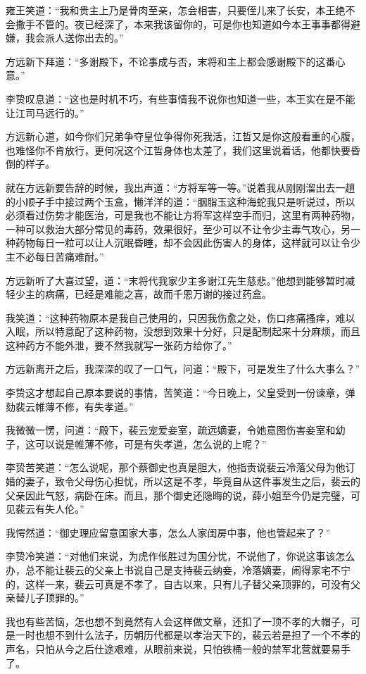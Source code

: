 雍王笑道：“我和贵主上乃是骨肉至亲，怎会相害，只要侄儿来了长安，本王绝不会撒手不管的。夜已经深了，本来我该留你的，可是你也知道如今本王事事都得避嫌，我会派人送你出去的。”

方远新下拜道：“多谢殿下，不论事成与否，末将和主上都会感谢殿下的这番心意。”

李贽叹息道：“这也是时机不巧，有些事情我不说你也知道一些，本王实在是不能让江司马远行的。”

方远新心道，如今你们兄弟争夺皇位争得你死我活，江哲又是你这般看重的心腹，也难怪你不肯放行，更何况这个江哲身体也太差了，我们这里说着话，他都快要昏倒的样子。

就在方远新要告辞的时候，我出声道：“方将军等一等。”说着我从刚刚溜出去一趟的小顺子手中接过两个玉盒，懒洋洋的道：“胭脂玉这种海蛇我只是听说过，所以必须看过伤势才能医治，可是我也不能让方将军这样空手而归，这里有两种药物，一种可以救治大部分常见的毒药，效果很好，至少可以不让令少主毒气攻心，另一种药物每日一粒可以让人沉眠昏睡，却不会因此伤害人的身体，这样就可以让令少主不必每日苦痛难耐。”

方远新听了大喜过望，道：“末将代我家少主多谢江先生慈悲。”他想到能够暂时减轻少主的病痛，已经是难能之喜，故而千恩万谢的接过药盒。

我笑道：“这种药物原本是我自己使用的，只因我伤愈之处，伤口疼痛搔痒，难以入眠，所以特意配了这种药物，没想到效果十分好，只是配制起来十分麻烦，而且这种药方不能外泄，要不然我就写一张药方给你了。”

方远新离开之后，我深深的叹了一口气，问道：“殿下，可是发生了什么大事么？”

李贽这才想起自己原本要说的事情，苦笑道：“今日晚上，父皇受到一份谏章，弹劾裴云帷薄不修，有失孝道。”

我微微一愣，问道：“殿下，裴云宠爱妾室，疏远嫡妻，令她意图伤害妾室和幼子，这可以说是帷薄不修，可是有失孝道，怎么说的上呢？”

李贽苦笑道：“怎么说呢，那个蔡御史也真是胆大，他指责说裴云冷落父母为他订婚的妻子，致令父母伤心担忧，所以这是不孝，毕竟自从这件事发生之后，裴云的父亲因此气怒，病卧在床。而且，那个御史还隐晦的说，薛小姐至今仍是完璧，可见裴云有失人伦。”

我愕然道：“御史理应留意国家大事，怎么人家闺房中事，他也管起来了？”

李贽冷笑道：“对他们来说，为虎作伥胜过为国分忧，不说他了，你说这事该怎么办，总不能让裴云的父亲上书说自己是支持裴云纳妾，冷落嫡妻，闹得家宅不宁的，这样一来，裴云可真是不孝了，自古以来，只有儿子替父亲顶罪的，可没有父亲替儿子顶罪的。”

我也有些苦恼，怎也想不到竟然有人会这样做文章，还扣了一顶不孝的大帽子，可是一时也想不到什么法子，历朝历代都是以孝治天下的，裴云若是担了一个不孝的声名，只怕从今之后仕途艰难，从眼前来说，只怕铁桶一般的禁军北营就要易手了。

